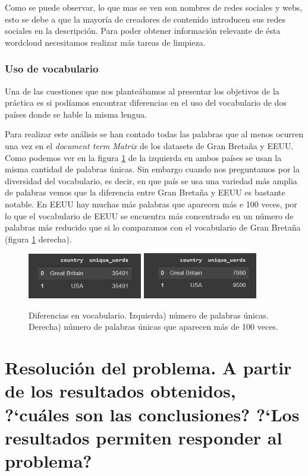 \documentclass[a4paper,12pt]{article}
\begin{document}
Como se puede observar, lo que mas se ven son nombres de redes sociales y webs, esto se debe a que la mayor\'ia de creadores de contenido introducen sus redes sociales en la descripci\'on. Para poder obtener informaci\'on relevante de \'esta wordcloud necesitamos realizar m\'as tareas de limpieza.

\subsubsection{Uso de vocabulario}
Una de las cuestiones que nos plante\'abamos al presentar los objetivos de la pr\'actica es si pod\'iamos encontrar diferencias en el uso del vocabulario de dos pa\'ises donde se hable la misma lengua.

Para realizar este an\'alisis se han contado todas las palabras que al menos ocurren una vez en el {\itshape document term Matrix} de los datasets de Gran Breta\~na y EEUU. Como podemos ver en la figura \ref{fig:voc} de la izquierda en ambos pa\'ises se usan la misma cantidad de palabras \'unicas. Sin embargo cuando nos preguntamos por la diversidad del vocabulario, es decir, en que pa\'is se usa una variedad m\'as amplia de palabras vemos que la diferencia entre Gran Breta\~na y EEUU es bastante notable. En EEUU hay muchas m\'as palabras que aparecen m\'as e 100 veces, por lo que el vocabulario de EEUU se encuentra m\'as concentrado en un n\'umero de palabras m\'as reducido que si lo comparamos con el vocabulario de Gran Breta\~na (figura \ref{fig:voc} derecha). 


\begin{figure}[h!]
\centering

\includegraphics[width=5cm]{coc_comp.JPG}
\includegraphics[width=5cm]{dif_voc.JPG}
\caption{Diferencias en vocabulario. Izquierda) n\'umero de palabras \'unicas. Derecha) n\'umero de palabras \'unicas que aparecen m\'as de 100 veces.}
\label{fig:voc}
\end{figure}

\section[item_conclusiones]{Resoluci\'on del problema. A partir de los resultados obtenidos, ?`cu\'ales son las conclusiones? ?`Los resultados permiten responder al problema?}
\end{document}
